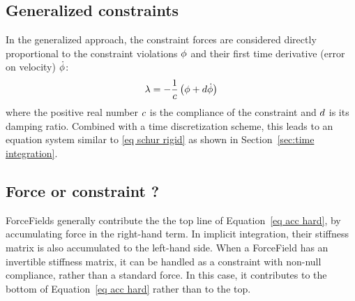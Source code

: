 \subsection{Generalized constraints}
In the generalized approach, the constraint forces are considered directly proportional to the constraint violations $\phi$ and their first time derivative (error on velocity) $\dot {\phi}$:
\begin{equation}\label{eq generalized constraint}
\mathbf{\lambda} = - \frac{1}{c} \left( \phi + d \dot {\phi} \right)
\end{equation}
where the positive real number $c$ is the compliance of the constraint and $d$ is its damping ratio.
Combined with a time discretization scheme, this leads to an equation system similar to \eqref{eq schur rigid} as shown in Section~\ref{sec:time integration}.

\subsection{Force or constraint ?} \label{sec force or constraint}
ForceFields generally contribute the the top line of Equation~\ref{eq acc hard}, by accumulating force in the right-hand term. In implicit integration, their stiffness matrix is also accumulated to the left-hand side.
When a ForceField has an invertible stiffness matrix, it can be handled as a constraint with non-null compliance, rather than a standard force. In this case, it contributes to the bottom of Equation~\ref{eq acc hard} rather than to the top.

